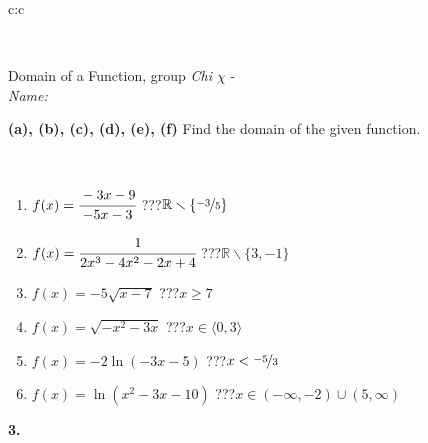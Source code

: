 \documentclass[10pt]{report}
\begin{document}
\begin{tabular}{c:c}
\begin{minipage}[c][104.5mm][t]{0.5\linewidth}
\begin{center}
\begin{minipage}{0.20\linewidth}
\end{minipage}
\end{center}
\end{minipage}
\\ \hdashline
\begin{minipage}[c][104.5mm][t]{0.5\linewidth}
\begin{center}
\vspace{7mm}
{\huge Domain of a Function, group \textit{Chi $\chi$} -}\\[5mm]
\textit{Name:}\phantom{xxxxxxxxxxxxxxxxxxxxxxxxxxxxxxxxxxxxxxxxxxxxxxxxxxxxxxxxxxxxxxxxx}\\[5mm]
\begin{minipage}{0.95\linewidth}
\begin{center}
{
\textbf{(a), (b), (c), (d), (e), (f)} Find the domain of the given function. \\[1mm]
\phantom{x}
}
\end{center}
\end{minipage}
\\[4mm]
\begin{minipage}{0.79\linewidth}
\begin{center}
\begin{varwidth}{\linewidth}
\begin{enumerate}
\normalsizerrr
\item $f(x)=\cfrac{-3x-9}{-5x-3}$\quad \dotfill\; ???\;\dotfill \quad $ \mathbb{R} \smallsetminus\{\nicefrac{-3}{5} \}$
\item $f(x)=\cfrac{1}{2x^3-4x^2-2x+4}$\quad \dotfill\; ???\;\dotfill \quad $ \mathbb{R} \smallsetminus\{3,-1 \}$
\item $f(x)=-5\sqrt{x-7}$\quad \dotfill\; ???\;\dotfill \quad $x\geq7$
\item $f(x)=\sqrt{-x^2-3x}$\quad \dotfill\; ???\;\dotfill \quad $x\in\langle0 , 3\rangle$
\item $f(x)=-2\ln{(-3x-5)}$\quad \dotfill\; ???\;\dotfill \quad $x<\nicefrac{-5}{3}$
\item $f(x)=\ln{(x^2-3x-10)}$\quad \dotfill\; ???\;\dotfill \quad $x\in(-\infty , -2)\cup(5 , \infty)$
\end{enumerate}
\end{varwidth}
\end{center}
\end{minipage}
\begin{minipage}{0.20\linewidth}
\begin{center}
{\Huge\bfseries 3.} \\[2mm]

\end{center}
\end{minipage}
\end{center}
\end{minipage}
\end{tabular}
\end{document}
